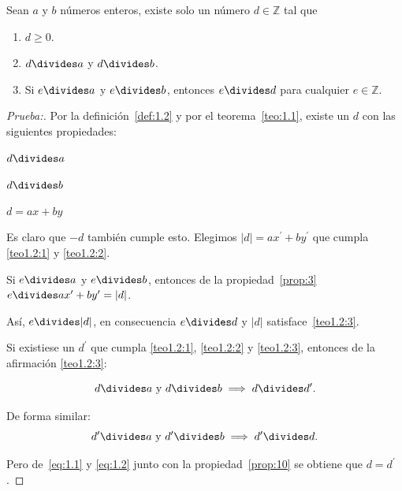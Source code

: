 \documentclass[oneside,a5paper]{memoir}
\begin{document}
\begin{theorem}\label{teo:1.2}
Sean $a$ y $b$ números enteros, existe solo un número $d\in\mathbb{Z}$ tal que

\begin{enumerate}[font={\bfseries},label={\arabic*)}]

\item\label{teo1.2:1} $d\geq0$.

\item\label{teo1.2:2} $d\divides a$ y $d\divides b$.

\item\label{teo1.2:3} Si $e\divides a$ y $e\divides b$, entonces $e\divides d$ para cualquier $e\in\mathbb{Z}$.

\end{enumerate}

\begin{proof}[Prueba:]
Por la definición~\ref{def:1.2} y por el teorema~\ref{teo:1.1}, existe un $d$ con las siguientes propiedades:
\begin{multicols}{3}
$d\divides a$

$d\divides b$

$d=ax+by$
\end{multicols}

\noindent
Es claro que $-d$ también cumple esto. Elegimos $|d|=ax^{\prime}+by^{\prime}$ que cumpla \ref{teo1.2:1} y \ref{teo1.2:2}.

\noindent
Si $e\divides a$ y $e\divides b$, entonces de la propiedad~\ref{prop:3} $e\divides ax^{\prime}+by^{\prime}=|d|$.
	
\noindent
Así, $e\divides |d|$, en consecuencia $e\divides d$ y $|d|$ satisface~\ref*{teo1.2:3}.
	
\noindent
Si existiese un $d^{\prime}$ que cumpla \ref{teo1.2:1}, \ref{teo1.2:2} y \ref{teo1.2:3}, entonces de la afirmación \ref{teo1.2:3}:

\begin{equation}\label{eq:1.1}
d\divides a\text{ y }d\divides b\implies d\divides d^{\prime}.
\end{equation}
	
\noindent
De forma similar:
\begin{equation}\label{eq:1.2}
d^{\prime}\divides a\text{ y }d^{\prime}\divides b\implies d^{\prime}\divides d.
\end{equation}

\noindent
Pero de~\eqref{eq:1.1} y \eqref{eq:1.2} junto con la propiedad~\ref{prop:10} se obtiene que $\boxed{d=d^{\prime}}$.
\end{proof}

\end{theorem}
\end{document}
